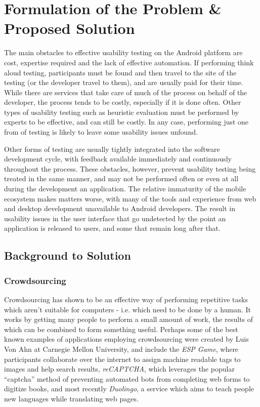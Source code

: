 \chapter{Formulation of the Problem \& Proposed Solution}

The main obstacles to effective usability testing on the Android platform are
cost, expertise required and the lack of effective automation.  If performing
think aloud testing, participants must be found and then travel to the site of
the testing (or the developer travel to them), and are usually paid for their
time. While there are services that take care of much of the process on behalf
of the developer, the process tends to be costly, especially if it is done
often.  Other types of usability testing such as heuristic evaluation must be
performed by experts to be effective, and can still be costly.  In any case,
performing just one from of testing is likely to leave some usability issues
unfound.

Other forms of testing are usually tightly integrated into the software development
cycle, with feedback available immediately and continuously throughout the process.
These obstacles, however, prevent usability testing being treated in the same manner,
and may not be performed often or
even at all during the development an application. The relative immaturity of the mobile
ecosystem makes matters worse, with many of the tools and experience from web and
desktop development unavailable to Android developers. The result in usability
issues in the user interface that go undetected by the point an application is
released to users, and some that remain long after that.

\section{Background to Solution}

\subsection{Crowdsourcing}

Crowdsourcing has shown to be an effective way of performing repetitive tasks
which aren't suitable for computers - i.e. which need to be done by a human. It
works by getting many people to perform a small amount of work, the results of
which can be combined to form something useful. Perhaps some of the best known
examples of applications employing crowdsourcing were created by Luis Von Ahn
at Carnegie Mellon University, and include the \emph{ESP Game}, where
participants collaborate over the internet to assign machine readable tags to
images and help search results, \emph{reCAPTCHA}, which leverages the popular
``captcha'' method of preventing automated bots from completing web forms to
digitize books, and most recently \emph{Duolingo}, a service which aims to
teach people new languages while translating web pages.

